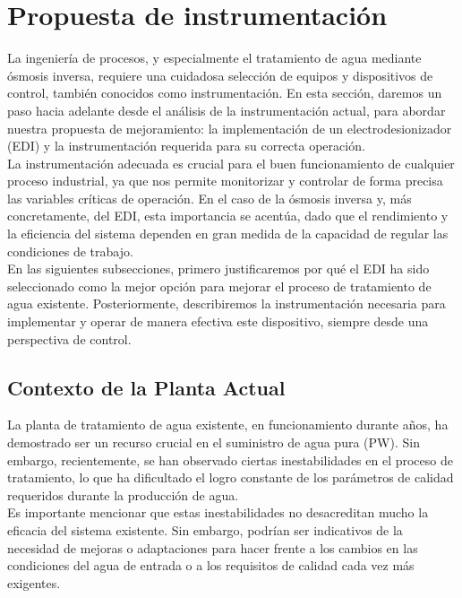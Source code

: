 \section{Propuesta de instrumentación}

La ingeniería de procesos, y especialmente el tratamiento de agua mediante ósmosis inversa, requiere una cuidadosa selección de equipos y dispositivos de control, también conocidos como instrumentación. En esta sección, daremos un paso hacia adelante desde el análisis de la instrumentación actual, para abordar nuestra propuesta de mejoramiento: la implementación de un electrodesionizador (EDI) y la instrumentación requerida para su correcta operación.\\

La instrumentación adecuada es crucial para el buen funcionamiento de cualquier proceso industrial, ya que nos permite monitorizar y controlar de forma precisa las variables críticas de operación. En el caso de la ósmosis inversa y, más concretamente, del EDI, esta importancia se acentúa, dado que el rendimiento y la eficiencia del sistema dependen en gran medida de la capacidad de regular las condiciones de trabajo.\\

En las siguientes subsecciones, primero justificaremos por qué el EDI ha sido seleccionado como la mejor opción para mejorar el proceso de tratamiento de agua existente. Posteriormente, describiremos la instrumentación necesaria para implementar y operar de manera efectiva este dispositivo, siempre desde una perspectiva de control.\\


\subsection{Contexto de la Planta Actual}

La planta de tratamiento de agua existente, en funcionamiento durante años,
ha demostrado ser un recurso crucial en el suministro de agua pura (PW).
Sin embargo, recientemente, se han observado ciertas inestabilidades en el
proceso de tratamiento, lo que ha dificultado el logro constante de los parámetros
de calidad requeridos durante la producción de agua.\\

Es importante mencionar que estas inestabilidades no desacreditan mucho la eficacia
del sistema existente. Sin embargo, podrían ser indicativos de la necesidad
de mejoras o adaptaciones para hacer frente a los cambios en las condiciones
del agua de entrada o a los requisitos de calidad cada vez más exigentes.\\

